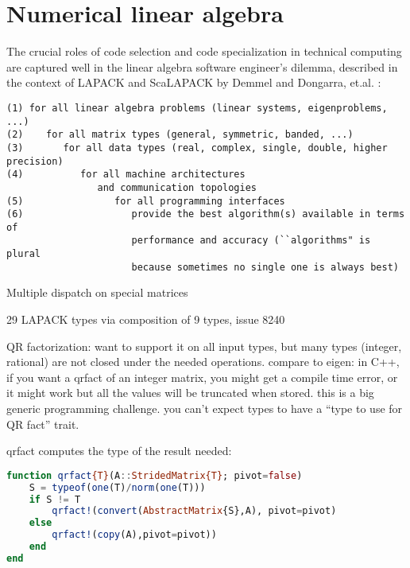 \section{Numerical linear algebra}
\label{sec:linalg}

The crucial roles of code selection and code specialization in technical
computing are captured well in the linear algebra software engineer's dilemma,
described in the context of LAPACK and ScaLAPACK by Demmel and Dongarra,
et.al. \cite{lawn181}:
\vspace{-3ex}
\begin{singlespace}
\begin{small}
\begin{verbatim}
(1) for all linear algebra problems (linear systems, eigenproblems, ...)
(2)    for all matrix types (general, symmetric, banded, ...)
(3)       for all data types (real, complex, single, double, higher precision)
(4)          for all machine architectures
                and communication topologies
(5)                for all programming interfaces
(6)                   provide the best algorithm(s) available in terms of
                      performance and accuracy (``algorithms" is plural
                      because sometimes no single one is always best)
\end{verbatim}
\end{small}
\end{singlespace}

Multiple dispatch on special matrices

29 LAPACK types via composition of 9 types, issue 8240

QR factorization: want to support it on all input types, but many
types (integer, rational) are not closed under the needed operations.
compare to eigen: in C++, if you want a qrfact of an integer matrix,
you might get a compile time error, or it might work but all the values
will be truncated when stored. this is a big generic programming
challenge. you can't expect types to have a ``type to use for QR fact''
trait.

qrfact computes the type of the result needed:

\begin{singlespace}
\begin{lstlisting}[language=julia]
function qrfact{T}(A::StridedMatrix{T}; pivot=false)
    S = typeof(one(T)/norm(one(T)))
    if S != T
        qrfact!(convert(AbstractMatrix{S},A), pivot=pivot)
    else
        qrfact!(copy(A),pivot=pivot))
    end
end
\end{lstlisting}
\end{singlespace}

